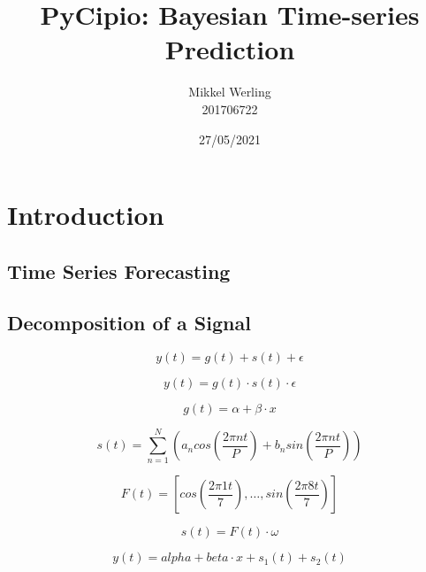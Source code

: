 \documentclass{article}
\title{PyCipio: Bayesian Time-series Prediction}
\author{Mikkel Werling\\201706722}
\date{27/05/2021}
\begin{document}
\maketitle
\section{Introduction}
\subsection{Time Series Forecasting}
\subsection{Decomposition of a Signal}

$$y(t) = g(t) + s(t) + \epsilon$$

$$y(t) = g(t) \cdot s(t) \cdot \epsilon $$

$$g(t) = \alpha + \beta \cdot x$$

$$s(t) = \sum _{n=1} ^N \left( a_n cos(\frac{2 \pi n t}{P}) + b_n sin(\frac{2 \pi n t}{P}) \right)$$

$$F(t) = \left[ cos(\frac{2 \pi 1 t}{7}), \dots, sin(\frac{2 \pi 8 t}{7}) \right]$$

$$s(t) = F(t) \cdot \omega$$

$$y(t) = alpha + beta \cdot x + s_1(t) + s_2(t)$$
\end{document}
